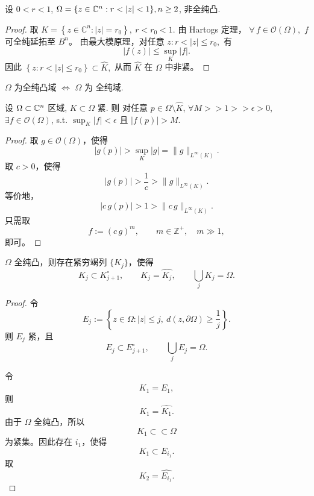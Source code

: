 \begin{example}
    设 $0<r<1$, $\Omega =\{z \in \cc^n: r <|z|<1\}, n \geq 2$, 非全纯凸.  
\end{example}
\begin{proof}
    取
\(
K=\left\{z\in\mathbb{C}^n:|z|=r_0\right\},
~
r<r_0<1.
\)
由 Hartogs 定理，
\(
\forall\,f\in\mathcal{O}(\Omega),
\)
\(f\) 可全纯延拓至 \(B^n\)。
由最大模原理，对任意
\(
z\colon r<|z|\leq r_0,
\)
有
\[
|f(z)|
\leq
\sup_K |f|.
\]
因此
\(
\left\{z:r<|z|\leq r_0\right\}
\subset \widehat{K},
\)
从而 \(\widehat{K}\) 在 \(\Omega\) 中非紧。
\end{proof}


\begin{theorem}\label{thm4.1}
    $\Omega $ 为全纯凸域 $\iff $ $\Omega $ 为 全纯域.   
\end{theorem}

\begin{lemma}\label{lem4.2}
    设 $\Omega \subset {\mathbb C}^n$ 区域, $K \subset \Omega $ 紧. 则 对任意 $p \in \Omega \setminus \hat{K}$, $\forall M >>1>>\epsilon >0$, $\exists f \in \mathcal{O}(\Omega )$, s.t. $\sup_{K }\left| f \right| <\epsilon $ 且 $\left| f(p) \right| >M$.       
\end{lemma}
\begin{proof}
取 \(g\in\mathcal{O}(\Omega)\)，使得
\[
|g(p)|
>
\sup_K |g|
=
\|g\|_{L^\infty(K)}.
\]
取 \(c>0\)，使得
\[
|g(p)|
>
\frac{1}{c}
>
\|g\|_{L^\infty(K)}.
\]
等价地，
\[
|c\,g(p)|
>
1
>
\|c\,g\|_{L^\infty(K)}.
\]
只需取
\[
f:=(c\,g)^m,
\qquad
m\in\mathbb{Z}^+,\quad m\gg1,
\]
即可。
\end{proof}

\begin{lemma}\label{lem4.3}
\(\Omega\) 全纯凸，则存在紧穷竭列 \(\{K_j\}\)，使得
\[
K_j\subset K_{j+1}^{\circ },
\qquad
K_j=\widehat{K_j},
\qquad
\bigcup_j K_j=\Omega.
\]
\end{lemma}

\begin{proof}
令
\[
E_j
:=
\left\{
z\in\Omega:
|z|\leq j,\ 
d(z,\partial\Omega)\geq \frac{1}{j}
\right\}.
\]
则 \(E_j\) 紧，且
\[
E_j\subset E_{j+1}^{\circ },
\qquad
\bigcup_j E_j=\Omega.
\]

令
\[
K_1=\widehat{E_1},
\]
则
\[
K_1=\widehat{K_1}.
\]
由于 \(\Omega\) 全纯凸，所以
\[
K_1\subset \subset \Omega
\]
为紧集。因此存在 \(i_1\)，使得
\[
K_1\subset E_{i_1}.
\]
取
\[
K_2=\widehat{E_{i_1}}.
\]
\end{proof}

